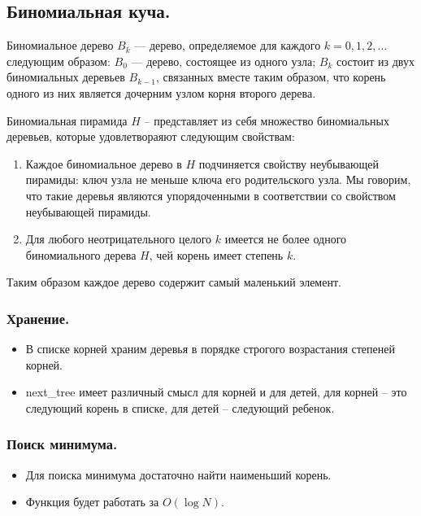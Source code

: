 \documentclass[a4paper,14pt]{article}
\begin{document}
    \subsection{Биномиальная куча.}
    \begin{Def}
        Биномиальное дерево $B_k$ — дерево, определяемое для каждого
$k = 0,1,2,\ldots$ следующим образом: $B_0$ — дерево, состоящее из одного
узла; $B_k$ состоит из двух биномиальных деревьев $B_{k-1}$, связанных
вместе таким образом, что корень одного из них является дочерним
узлом корня второго дерева.
    \end{Def}
    \begin{Def}
        Биномиальная пирамида $H$ – представляет из себя множество
биномиальных деревьев, которые удовлетвораяют следующим
свойствам:
        \begin{enumerate}
            \item Каждое биномиальное дерево в $H$ подчиняется свойству
            неубывающей пирамиды: ключ узла не меньше ключа его
            родительского узла. Мы говорим, что такие деревья являются
            упорядоченными в соответствии со свойством неубывающей
            пирамиды.
            \item Для любого неотрицательного целого $k$ имеется не более
            одного биномиального дерева $H$, чей корень имеет степень $k$.
        \end{enumerate}
        Таким образом каждое дерево содержит самый маленький элемент.
    \end{Def}
    \subsubsection*{Хранение.}
    \begin{itemize}
        \item В списке корней храним деревья в порядке строгого
        возрастания степеней корней.
        \item next\_tree имеет различный смысл для корней и для детей, для
        корней – это следующий корень в списке, для детей –
        следующий ребенок.
    \end{itemize}
    \subsubsection*{Поиск минимума.}
    \begin{itemize}
        \item Для поиска минимума достаточно найти наименьший корень.
        \item Функция будет работать за $O(\log N)$.
    \end{itemize}
\end{document}
